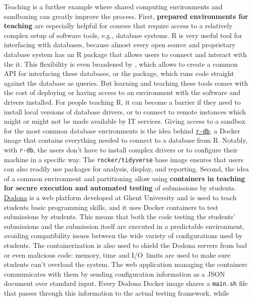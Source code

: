 Teaching is a further example where shared computing environments and
sandboxing can greatly improve the process. First, \textbf{prepared
environments for teaching} are especially helpful for courses that
require access to a relatively complex setup of software tools, e.g.,
database systems. R is very useful tool for interfacing with databases,
because almost every open source and proprietary database system has an
R package that allows users to connect and interact with the it. This
flexibility is even broadened by , which allows to create a
common API for interfacing these databases, or the 
package, which runs  code straight against the database
as queries. But learning and teaching these tools comes with the cost of
deploying or having access to an environment with the software and
drivers installed. For people teaching R, it can become a barrier if
they need to install local versions of database drivers, or to connect
to remote instances which might or might not be made available by IT
services. Giving access to a sandbox for the most common database
environments is the idea behind
\href{https://github.com/ColinFay/r-db}{\texttt{r-db}}, a Docker image
that contains everything needed to connect to a database from R.
Notably, with \texttt{r-db}, the users don't have to install complex
drivers or to configure their machine in a specific way. The
\texttt{rocker/tidyverse} base image ensures that users can also readily
use packages for analysis, display, and reporting. Second, the idea of a
common environment and partitioning allow using \textbf{containers in
teaching for secure execution and automated testing} of submissions by
students. \href{https://dodona.ugent.be}{Dodona} is a web platform
developed at Ghent University and is used to teach students basic
programming skills, and it uses Docker containers to test submissions by
students. This means that both the code testing the students'
submissions and the submission itself are executed in a predictable
environment, avoiding compatibility issues between the wide variety of
configurations used by students. The containerization is also used to
shield the Dodona servers from bad or even malicious code: memory, time
and I/O~limits are used to make sure students can't overload the system.
The web application managing the containers communicates with them by
sending configuration information as a JSON document over standard
input. Every Dodona Docker image shares a \texttt{main.sh} file that
passes through this information to the actual testing framework, while
